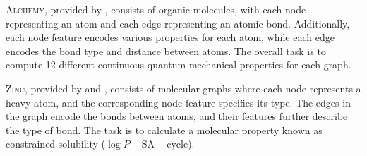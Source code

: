 \textsc{Alchemy}, provided by \cite{Chen2019alchemy}, consists of organic molecules, with each node representing an atom and each edge representing an atomic bond. Additionally, each node feature encodes various properties for each atom, while each edge encodes the bond type and distance between atoms. The overall task is to compute 12 different continuous quantum mechanical properties for each graph.\par\medskip

\textsc{Zinc}, provided by \cite{Bresson2019} and \cite{Irwin2012}, consists of molecular graphs where each node represents a heavy atom, and the corresponding node feature specifies its type. The edges in the graph encode the bonds between atoms, and their features further describe the type of bond. The task is to calculate a molecular property known as constrained solubility ($\log P - \text{SA} - \text{cycle}$).\par\medskip

